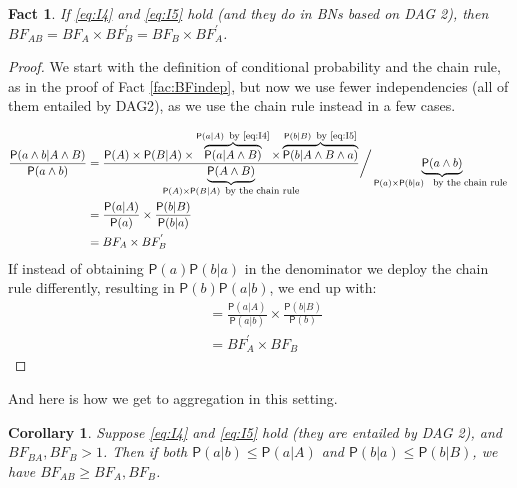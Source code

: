 \documentclass[
  10pt,
  dvipsnames,enabledeprecatedfontcommands]{scrartcl}
\newtheorem{fact}{Fact}
\newcommand{\et}{\wedge}
\newcommand{\pr}[1]{\ensuremath{\mathsf{P}(#1)}}
\newtheorem{corollary}{Corollary}[fact]
\begin{document}
\begin{fact} If \eqref{eq:I4} and \eqref{eq:I5}  hold (and they do in BNs based on \textsf{DAG 2}), then $BF_{AB} =  BF_{A}\times BF^{'}_{B}  = BF_{B} \times BF^{'}_{A}$. \label{fac:BFdep}
\end{fact}

\begin{proof}

We start with the definition of conditional probability and the chain rule, as in the proof of Fact \ref{fac:BFindep}, but now we use fewer  independencies (all of them entailed by \textsf{DAG2}), as we use the chain rule instead in a few cases. 

 \begin{align*}
\frac{\pr{a \wedge b\vert A\wedge B}}{\pr{a \wedge b}} &
= \frac{\pr{A} \times \pr {B \vert A}  \times
\overbrace{\pr{a \vert A \et B}}^{\pr{a \vert A} \mbox{\footnotesize \, by \eqref{eq:I4}}}
\times \overbrace{\pr{b \vert A \et B \et a}}^{\pr{b \vert B} \mbox{\footnotesize \, by \eqref{eq:I5}}}
}{\underbrace{\pr{A \et B}}_{\pr{A} \times \pr{B\vert A} \mbox{\footnotesize \, by the chain rule}}} \bigg/ \underbrace{\pr{a \wedge b}}_{\pr{a}\times \pr{b\vert a} \mbox{ \footnotesize \, by the chain rule }}\\
& = \frac{\pr{a \vert A}}{\pr{a}} \times \frac{\pr{b\vert B}}{\pr{b \vert a}}\\
& = BF_{A} \times BF^{'}_{B}
\end{align*}
If instead of obtaining $\pr{a}\pr{b \vert a}$ in the denominator we deploy the chain rule differently, resulting in $\pr{b}\pr{a \vert b}$, we end up with:
\begin{align*}
& = \frac{\pr{a \vert A}}{\pr{a \vert b}} \times \frac{\pr{b\vert B}}{\pr{b}}\\
& = BF^{'}_{A} \times BF_{B}
\end{align*}

\end{proof}

And here is how we get to aggregation in this setting.

\begin{corollary} Suppose \eqref{eq:I4} and \eqref{eq:I5}  hold (they are entailed by \textsf{DAG 2}), and $BF_{BA}, BF_{B} >1$. 
Then if both $\pr{a\vert b} \leq \pr{a \vert A}$ and \linebreak  $\pr{b \vert a} \leq \pr{b\vert B}$, we have $BF_{AB}\geq BF_{A}, BF_{B}$. \label{cor:BFweaker2}
\end{corollary}
\end{document}

